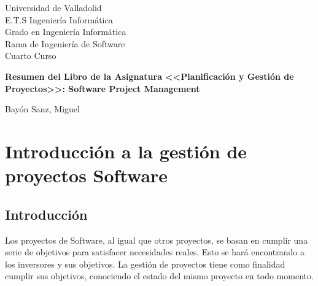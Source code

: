 \documentclass[12pt]{article}
\begin{document}
\begin{titlepage}
\begin{flushright}
\hfill\parbox[r][][c]{0.5\textwidth}{
{\fontsize{14}{14}\selectfont Universidad de Valladolid \\
E.T.S Ingeniería Informática \\
Grado en Ingeniería Informática\\
Rama de Ingeniería de Software\\
Cuarto Curso}}

\end{flushright}

\vfill
\centering
{\fontsize{16pt}{1cm}\selectfont \textbf{Resumen del Libro de la Asignatura <<Planificación y Gestión de Proyectos>>: Software Project Management}}


\vfill
\begin{flushright}
\hfill\parbox[r][][c]{0.4\textwidth}{
{\fontsize{14pt}{14cm}\selectfont
Bayón Sanz, Miguel
}
}
\end{flushright}

\end{titlepage}

\tableofcontents
\newpage


\newpage
\section{Introducción a la gestión de proyectos Software}
\label{1.0.0}
\subsection{Introducción}
\label{1.1.0}

{Los proyectos de Software, al igual que otros proyectos, se basan en cumplir una serie de objetivos para satisfacer necesidades reales. Esto se hará encontrando a los inversores y sus objetivos. La gestión de proyectos tiene como finalidad cumplir sus objetivos, conociendo el estado del mismo proyecto en todo momento.}
\end{document}
